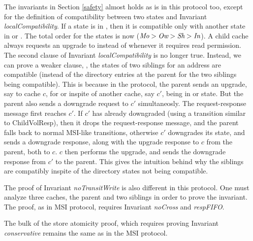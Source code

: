 The invariants in Section \ref{safety} almost holds as is in this protocol too,
except for the definition of compatibility between two states and Invariant
\textit{localCompatibility}. If a state is in \Ow{}, then it is compatible only
with another state in \Sh{} or \In{}. The total order for the states is now
($\textit{Mo} > \textit{Ow} > \textit{Sh} > \textit{In}$). A child cache always requests an upgrade to \Ow{}
instead of \Sh{} whenever it requires read permission. The second clause of
Invariant \textit{localCompatibility} is no longer true. Instead, we can prove
a weaker clause, \viz, the states of two siblings for an address are compatible
(instead of the directory entries at the parent for the two siblings being
compatible).  This is because in the protocol, the parent sends an upgrade, say
to cache $c$, for \Ow{} or \Mo{} inspite of another cache, say $c'$, being in
\Ow{} or \Mo{} state. But the parent also sends a downgrade request to $c'$
simultaneosly. The request-response message first reaches $c'$. If $c'$ has
already downgraded (using a transition similar to ChildVolResp), then it drops
the request-response message, and the parent falls back to normal MSI-like
transitions, otherwise $c'$ downgrades its state, and sends a downgrade
response, along with the upgrade response to $c$ from the parent, both to $c$.
$c$ then performs the upgrade, and sends the downgrade response from $c'$ to
the parent. This gives the intuition behind why the siblings are compatibly
inspite of the directory states not being compatible.

The proof of Invariant \textit{noTransitWrite} is also different in this
protocol. One must analyze three caches, the parent and two siblings in order
to prove the invariant. The proof, as in MSI protocol, requires Invariant
\textit{noCross} and \textit{respFIFO}.

The bulk of the store atomicity proof, which requires proving Invariant
\textit{conservative} remains the same as in the MSI protocol.
